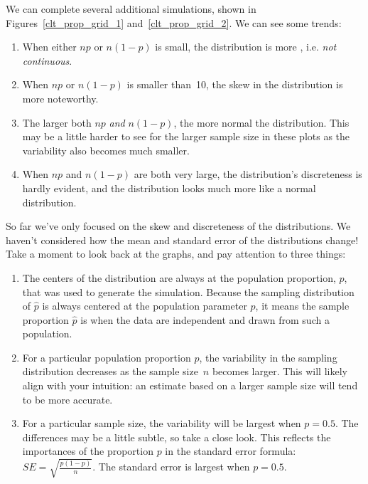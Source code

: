 \pagebreak



We can complete several additional simulations,
shown in
Figures~\ref{clt_prop_grid_1}
and~\ref{clt_prop_grid_2}.
We can see some trends:
\begin{enumerate}
\item When either $np$ or $n(1 - p)$ is small, the
    distribution is more ,
    i.e. \emph{not continuous}.
\item When $np$ or $n(1-p)$ is smaller than~10,
    the skew in the distribution is more noteworthy.
\item The larger both $np$ \emph{and} $n(1 - p)$,
    the more normal the distribution.
    This may be a little harder to see for the larger
    sample size in these plots as the variability
    also becomes much smaller.
\item When $np$ and $n(1 - p)$ are both very large,
    the distribution's discreteness is hardly evident,
    and the distribution looks much more
    like a normal distribution.
\end{enumerate}

So far we've only focused on the skew and discreteness
of the distributions. We haven't considered
how the mean and standard error
of the distributions change!
Take a moment to look back at the graphs,
and pay attention to three things:
\begin{enumerate}
\item The centers of the distribution are always at
    the population proportion, $p$, that was used to
    generate the simulation. Because the sampling
    distribution of $\hat{p}$ is always centered at
    the population parameter $p$, it means the sample
    proportion $\hat{p}$ is  when
    the data are independent and drawn from such
    a population.
\item For a particular population proportion $p$,
    the variability in the sampling distribution
    decreases as the sample size~$n$ becomes larger.
    This will likely align with your intuition:
    an estimate based on a larger sample size will
    tend to be more accurate.
\item For a particular sample size, the variability
    will be largest when $p = 0.5$. The differences
    may be a little subtle, so take a close look.
    This reflects the importances of the proportion
    $p$ in the standard error formula:
    $SE = \sqrt{\frac{p (1 - p)}{n}}$.
    The standard error is largest when $p = 0.5$.
\end{enumerate}

